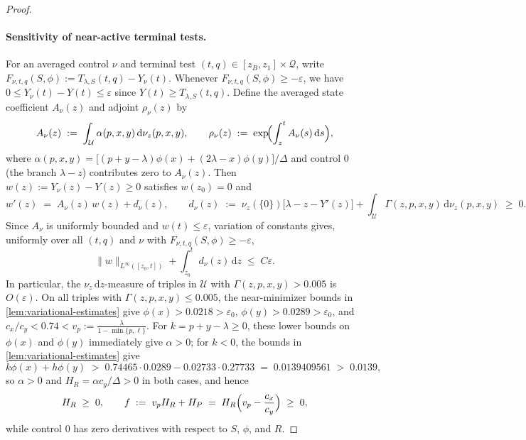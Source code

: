 \documentclass[11pt]{article}
\numberwithin{equation}{section}
\theoremstyle{plain}
\theoremstyle{definition}
\newcommand{\1}{\mathbf{1}}
\newcommand{\calQ}{\mathcal{Q}}
\newcommand{\calU}{\mathcal{U}}
\begin{document}
\begin{proof}
\paragraph{Sensitivity of near-active terminal tests.}
For an averaged control $\nu$ and terminal test $(t, q) \in [z_B, z_1] \times \calQ$, write $F_{\nu, t, q}(S, \phi) := T_{\lambda, S}(t, q) - Y_\nu(t)$. Whenever $F_{\nu, t, q}(S, \phi) \ge -\varepsilon$, we have $0 \le Y_\nu(t) - Y(t) \le \varepsilon$ since $Y(t) \ge T_{\lambda, S}(t, q)$. Define the averaged state coefficient $A_\nu(z)$ and adjoint $\rho_\nu(z)$ by
\[
  A_\nu(z) \;:=\; \int_{\calU} \alpha(p, x, y)\,\mathrm{d}\nu_z(p, x, y),
  \qquad
  \rho_\nu(z) \;:=\; \exp\!\Bigl(\int_z^t A_\nu(s)\,\mathrm{d}s\Bigr),
\]
where $\alpha(p, x, y) = \bigl[(p + y - \lambda)\phi(x) + (2\lambda - x)\phi(y)\bigr]/\Delta$ and control $0$ (the branch $\lambda - z$) contributes zero to $A_\nu(z)$. Then $w(z) := Y_\nu(z) - Y(z) \ge 0$ satisfies $w(z_0) = 0$ and
\[
  w'(z) \;=\; A_\nu(z)\,w(z) + d_\nu(z),
  \qquad
  d_\nu(z) \;:=\; \nu_z(\{0\})\bigl[\lambda - z - Y'(z)\bigr] + \int_{\calU} \Gamma(z, p, x, y)\,\mathrm{d}\nu_z(p, x, y) \;\ge\; 0.
\]
Since $A_\nu$ is uniformly bounded and $w(t) \le \varepsilon$, variation of constants gives, uniformly over all $(t, q)$ and $\nu$ with $F_{\nu, t, q}(S, \phi) \ge -\varepsilon$,
\begin{equation}
  \|w\|_{L^\infty([z_0, t])} + \int_{z_0}^t d_\nu(z)\,\mathrm{d}z \;\le\; C\varepsilon.
  \label{eq:needle-gap-budget}
\end{equation}
In particular, the $\nu_z\,\mathrm{d}z$-measure of triples in $\calU$ with $\Gamma(z, p, x, y) > 0.005$ is $O(\varepsilon)$. On all triples with $\Gamma(z, p, x, y) \le 0.005$, the near-minimizer bounds in \cref{lem:variational-estimates} give $\phi(x) > 0.0218 > \varepsilon_0$, $\phi(y) > 0.0289 > \varepsilon_0$, and $c_x/c_y < 0.74 < v_p := \frac{\lambda}{1 - \min\{p, \ell\}}$. For $k = p + y - \lambda \ge 0$, these lower bounds on $\phi(x)$ and $\phi(y)$ immediately give $\alpha > 0$; for $k < 0$, the bounds in \cref{lem:variational-estimates} give
\[
  k\phi(x) + h\phi(y) \;>\; 0.74465 \cdot 0.0289 - 0.02733 \cdot 0.27733 \;=\; 0.0139409561 \;>\; 0.0139,
\]
so $\alpha > 0$ and $H_R = \alpha c_y/\Delta > 0$ in both cases, and hence
\[
  H_R \;\ge\; 0,
  \qquad
  f \;:=\; v_p H_R + H_P \;=\; H_R\Bigl(v_p - \frac{c_x}{c_y}\Bigr) \;\ge\; 0,
\]
while control $0$ has zero derivatives with respect to $S$, $\phi$, and $R$.


\end{proof}
\end{document}
